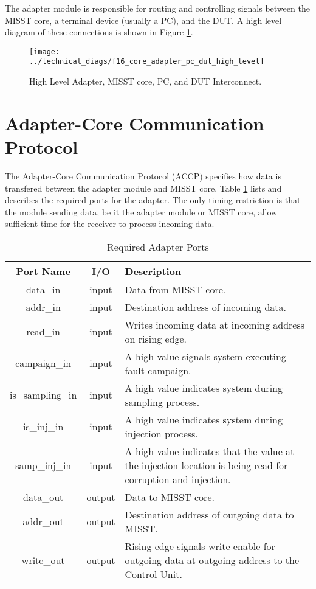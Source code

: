 \documentclass[]{report}
\begin{document}
The adapter module is responsible for routing and controlling signals between the MISST core, a terminal device (usually a PC), and the DUT. A high level diagram of these connections is shown in Figure \ref{fig:adapter high level interconnect}.

\begin{figure} [h]
	\centering
	\texttt{[image: ../technical\_diags/f16\_core\_adapter\_pc\_dut\_high\_level]}
	\caption{High Level Adapter, MISST core, PC, and DUT Interconnect.}
	\label{fig:adapter high level interconnect}
\end{figure}


\section{Adapter-Core Communication Protocol}
\label{s adapter protocol}

The Adapter-Core Communication Protocol (ACCP) specifies how data is transfered between the adapter module and MISST core.  Table \ref{table:adapter required ports} lists and describes the required ports for the adapter. The only timing restriction is that the module sending data, be it the adapter module or MISST core, allow sufficient time for the receiver to process incoming data.

\begin{table}[h]
	\centering
	\caption{Required Adapter Ports}
	\begin{tabular}{|c|c|p{12cm}|}
		\hline 
		Port Name & I/O & Description \\ 
		\hline 
		data\_in & input & Data from MISST core. \\ 
		\hline 
		addr\_in & input & Destination address of incoming data. \\ 
		\hline 
		read\_in & input & Writes incoming data at incoming address on rising edge. \\ 
		\hline 
		campaign\_in & input & A high value signals system executing fault campaign. \\ 
		\hline 
		is\_sampling\_in & input & A high value indicates system during sampling process. \\ 
		\hline 
		is\_inj\_in & input & A high value indicates system during injection process. \\ 
		\hline
		samp\_inj\_in & input & A high value indicates that the value at the injection location is being read for corruption and injection. \\
		\hline 
		data\_out & output & Data to MISST core. \\ 
		\hline 
		addr\_out & output & Destination address of outgoing data to MISST. \\ 
		\hline 
		write\_out & output & Rising edge signals write enable for outgoing data at outgoing address to the Control Unit. \\ 
		\hline 
	\end{tabular} 
	\label{table:adapter required ports}
\end{table}
\end{document}

